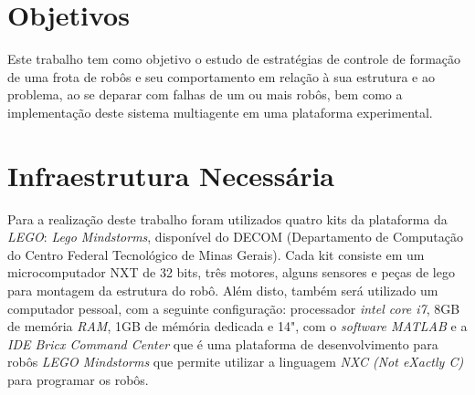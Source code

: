 \section{Objetivos}
\label{sec:objetivos}

Este trabalho tem como objetivo o estudo de estratégias de controle de formação de uma frota de robôs e seu comportamento em relação à sua estrutura e ao problema, ao se deparar com falhas de um ou mais robôs, bem como a implementação deste sistema multiagente em uma plataforma experimental.%

\section{Infraestrutura Necessária}
\label{sec:infra}


Para a realização deste trabalho foram utilizados quatro kits da plataforma da \emph{LEGO}: \emph{Lego Mindstorms}, disponível do DECOM (Departamento de Computação do Centro Federal Tecnológico de Minas Gerais). Cada kit consiste em um microcomputador NXT de 32 bits, três motores, alguns sensores e peças de lego para montagem da estrutura do robô. Além disto, também será utilizado  um computador pessoal, com a seguinte configuração: processador \emph{intel core i7}, 8GB de memória \emph{RAM}, 1GB de mémória dedicada e 14", com o \emph{software MATLAB} e a \emph{IDE Bricx Command Center} \cite{sorceforge2001} que é uma plataforma de desenvolvimento para robôs \emph{LEGO Mindstorms} que permite utilizar a linguagem \emph{NXC (Not eXactly C)} para programar os robôs.